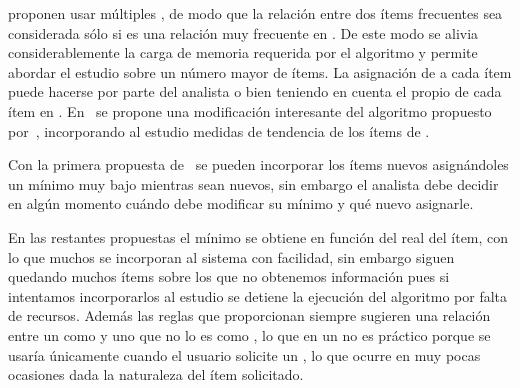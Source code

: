 















\cite{LiuHsuMa-ARMWithMultipleMS-1999} proponen usar múltiples \soportes, de modo que la relación
entre dos ítems frecuentes sea considerada sólo si es una relación muy frecuente en \D. De este modo se alivia considerablemente la carga de memoria requerida por el algoritmo y permite abordar el estudio sobre un número mayor de ítems. La asignación de \soporte a cada ítem puede hacerse por parte del analista o bien teniendo en cuenta el propio \soporte de cada ítem en \D. En~\cite{KiranReddy-ImprovedMultipleMSBasedAppMineRareAR-2009} se propone una modificación interesante del algoritmo propuesto por~\cite{LiuHsuMa-ARMWithMultipleMS-1999}, incorporando al estudio medidas de tendencia de los ítems de \D.

Con la primera propuesta de~\cite{LiuHsuMa-ARMWithMultipleMS-1999} se pueden incorporar los ítems nuevos asignándoles un \soporte
mínimo muy bajo mientras sean nuevos, sin embargo el analista debe decidir en algún momento cuándo debe modificar su \soporte mínimo y qué nuevo \soporte asignarle.

En las restantes propuestas el \soporte mínimo se obtiene en función del \soporte real del ítem, con lo que muchos \irs se incorporan al sistema con facilidad, sin embargo siguen quedando muchos ítems sobre los que no obtenemos información pues si intentamos incorporarlos al estudio se detiene la ejecución del algoritmo por falta de recursos. Además las reglas que proporcionan siempre sugieren una relación entre un \ir como \antecedente y uno que no lo es como \consecuente, lo que en un \sr no es práctico porque se usaría únicamente cuando el usuario solicite un \ir, lo que ocurre en muy pocas ocasiones dada la naturaleza del ítem solicitado.















